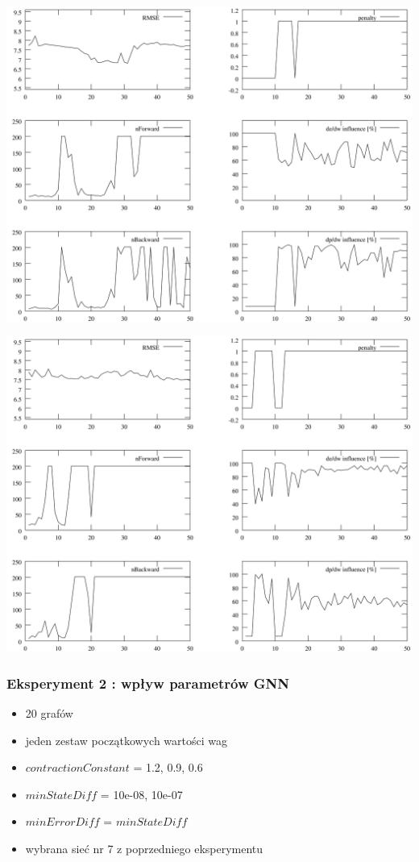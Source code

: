 \documentclass{beamer}
\begin{document}
\begin{frame}
	\includegraphics[scale=0.065]{img/gnn1}
\end{frame}
\begin{frame}
	\includegraphics[scale=0.065]{img/gnn8}
\end{frame}

\begin{frame}
\frametitle{Eksperyment 2 : wpływ parametrów GNN}
\begin{itemize}
	\item 20 grafów
	\item jeden zestaw początkowych wartości wag
	\item $contractionConstant$ = 1.2, 0.9, 0.6
	\item $minStateDiff$ = 10e-08, 10e-07
	\item $minErrorDiff$ = $minStateDiff$
	\item wybrana sieć nr 7 z poprzedniego eksperymentu
\end{itemize}
\end{frame}
\end{document}
